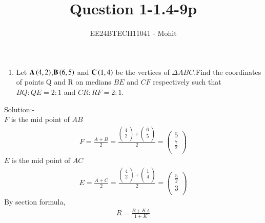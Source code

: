 \documentclass[journal]{IEEEtran}
\numberwithin{equation}{enumi}
\numberwithin{figure}{enumi}
\begin{document}

\title{Question 1-1.4-9p}
\author{EE24BTECH11041 - Mohit}
{\let\newpage\relax\maketitle}
\begin{enumerate}
	\item Let $\mathbf{A}\left(4,2\right)$,$\mathbf{B}\left(6,5\right)$ and $\mathbf{C}\left(1,4\right)$ be the vertices of $\Delta$$ABC$.Find the coordinates of points Q and R on medians $BE$ and $CF$ respectively such that $BQ:QE=2:1$ and $CR:RF=2:1$.
\end{enumerate}
Solution:-\\
$F$ is the mid point of $AB$\\
\begin{align*}
F=\frac{A+B}{2}=\frac{\begin{pmatrix}4\\2\\ \end{pmatrix} + \begin{pmatrix}6\\5\\ \end{pmatrix}}{2}
=\begin{pmatrix}5\\ \frac{7}{2}\\ \end{pmatrix}
\end{align*}
$E$ is the mid point of $AC$\\
\begin{align*}
E=\frac{A+C}{2}=\frac{\begin{pmatrix}4\\2\\ \end{pmatrix} + \begin{pmatrix}1\\4\\ \end{pmatrix}}{2}
=\begin{pmatrix}\frac{5}{2}\\3\\ \end{pmatrix}
\end{align*}
By section formula,
\begin{align*}
    R=\frac{B+KA}{1+K}
\end{align*}
\end{document}
